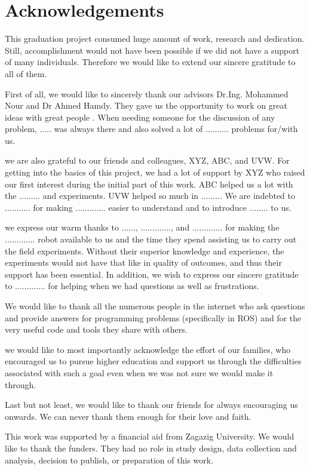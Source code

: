 
\chapter*{Acknowledgements}

This graduation project consumed huge amount of work, research and dedication. Still, accomplishment would not have been possible if we did not have a support of many individuals. Therefore we would like to extend our sincere gratitude to all of them.

First of all, we would like to sincerely thank our advisors Dr.Ing. Mohammed Nour and Dr Ahmed Hamdy. They gave us the opportunity to work on great ideas with great people . When needing someone for the
discussion of any problem, ..... was always there and also solved a lot of .......... problems for/with us.



we are also grateful to our friends and colleagues, XYZ, ABC, and UVW. For getting into the basics of this project, we had a lot of support by XYZ who raised our first interest during the initial part of this work. ABC helped us a lot with the .........  and experiments. UVW helped so much in ......... We are indebted to ........... for making ............. easier to understand and to introduce ........ to us. 

we express our warm thanks to ......, ............., and ............. for making the ............. robot available to us and the time they spend assisting us to carry out the field experiments. Without their superior knowledge and experience, the experiments would not have that like in quality of outcomes, and thus their support has been essential. In addition, we wish to express our sincere gratitude to ............. for helping when we had questions as well as frustrations.


We would like to thank all the numerous people in the internet who ask questions and provide answers for programming problems (specifically in ROS) and for the very useful code and tools they share with others.

we would like to most importantly acknowledge the effort of our families, who encouraged us to pursue higher education and support us through the difficulties associated with such a goal even when we was not sure we would make it through. 

Last but not least, we would like to thank our friends for always encouraging us onwards. We can
never thank them enough for their love and faith.

This work was supported by a financial aid  from Zagazig University. We would like to thank the funders. They had no role in study design, data collection and analysis, decision to publish, or preparation of this work.

